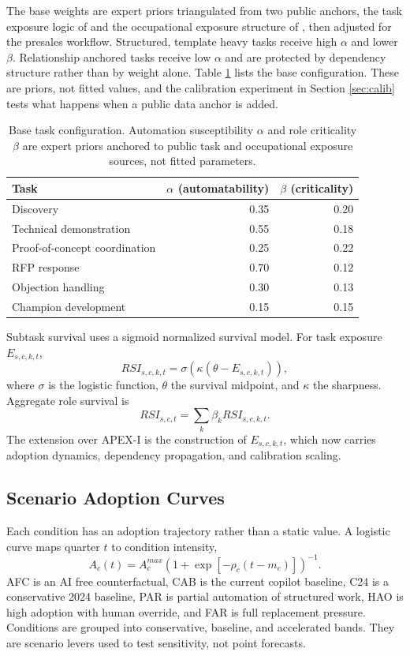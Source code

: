 \documentclass[10pt,conference]{IEEEtran}
\begin{document}
The base weights are expert priors triangulated from two public anchors, the task exposure logic of \cite{eloundou2023gpts} and the occupational exposure structure of \cite{felten2021occupational}, then adjusted for the presales workflow. Structured, template heavy tasks receive high $\alpha$ and lower $\beta$. Relationship anchored tasks receive low $\alpha$ and are protected by dependency structure rather than by weight alone. Table \ref{tab:weights} lists the base configuration. These are priors, not fitted values, and the calibration experiment in Section \ref{sec:calib} tests what happens when a public data anchor is added.

\begin{table}[t]
\caption{Base task configuration. Automation susceptibility $\alpha$ and role criticality $\beta$ are expert priors anchored to public task and occupational exposure sources, not fitted parameters.}
\centering
\begin{tabular}{lrr}
\toprule
Task & $\alpha$ (automatability) & $\beta$ (criticality) \\
\midrule
Discovery & 0.35 & 0.20 \\
Technical demonstration & 0.55 & 0.18 \\
Proof-of-concept coordination & 0.25 & 0.22 \\
RFP response & 0.70 & 0.12 \\
Objection handling & 0.30 & 0.13 \\
Champion development & 0.15 & 0.15 \\
\bottomrule
\end{tabular}
\label{tab:weights}
\end{table}

Subtask survival uses a sigmoid normalized survival model. For task exposure $E_{s,c,k,t}$,
\begin{equation}
RSI_{s,c,k,t}=\sigma(\kappa(\theta - E_{s,c,k,t})),
\end{equation}
where $\sigma$ is the logistic function, $\theta$ the survival midpoint, and $\kappa$ the sharpness. Aggregate role survival is
\begin{equation}
RSI_{s,c,t}=\sum_k \beta_{k} RSI_{s,c,k,t}.
\end{equation}
The extension over APEX-I is the construction of $E_{s,c,k,t}$, which now carries adoption dynamics, dependency propagation, and calibration scaling.

\subsection{Scenario Adoption Curves}
Each condition has an adoption trajectory rather than a static value. A logistic curve maps quarter $t$ to condition intensity,
\begin{equation}
A_c(t)=A^{max}_c(1+\exp[-\rho_c(t-m_c)])^{-1}.
\end{equation}
AFC is an AI free counterfactual, CAB is the current copilot baseline, C24 is a conservative 2024 baseline, PAR is partial automation of structured work, HAO is high adoption with human override, and FAR is full replacement pressure. Conditions are grouped into conservative, baseline, and accelerated bands. They are scenario levers used to test sensitivity, not point forecasts.
\end{document}
